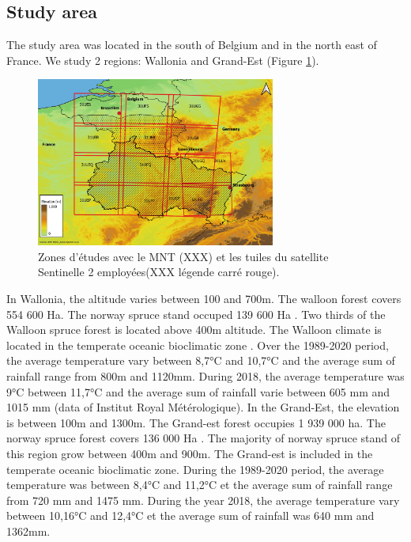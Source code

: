 \documentclass[3p,procedia]{elsarticle}
\begin{document}
\subsection{Study area}
The study area was located in the south of Belgium and in the north east of France. We study 2 regions: Wallonia and Grand-Est (Figure \ref{fig:situ}).
\begin{figure} [htbp] 
	\centering
	\includegraphics[width=0.7\textwidth]{gde.jpeg}
	\caption{Zones d'études avec le MNT (XXX) et les tuiles du satellite Sentinelle 2 employées(XXX légende carré rouge).}
	\label{fig:situ}
\end{figure}
In Wallonia, the altitude varies between 100 and 700m.
The walloon forest covers 554 600 Ha. 
The norway spruce stand occuped 139 600 Ha \citep{Alderweireld_2015}. 
Two thirds of the Walloon spruce forest is located above 400m altitude. 
The Walloon climate is located in the temperate oceanic bioclimatic zone \citep{lindner_climate_2010}. 
Over the 1989-2020 period, the average temperature vary between 8,7°C and 10,7°C and the average sum of rainfall range from 800m and 1120mm. 
During 2018, the average temperature was 9°C between 11,7°C and the average sum of rainfall varie between 605 mm and 1015 mm (data of Institut Royal Métérologique). 
In the Grand-Est, the elevation is between 100m and 1300m. 
The Grand-est forest occupies 1 939 000 ha. 
The norway spruce forest covers 136 000 Ha \citep{IGN2022}. 
The majority of norway spruce stand of this region grow between 400m and 900m. 
The Grand-est is included in the temperate oceanic bioclimatic zone\citep{lindner_climate_2010}. 
During the 1989-2020 period, the average temperature was between  8,4°C and 11,2°C et the average sum of rainfall range from 720 mm and 1475 mm. During the year 2018, the average temperature vary between 10,16°C and 12,4°C et the average sum of rainfall was 640 mm and 1362mm.
\end{document}
